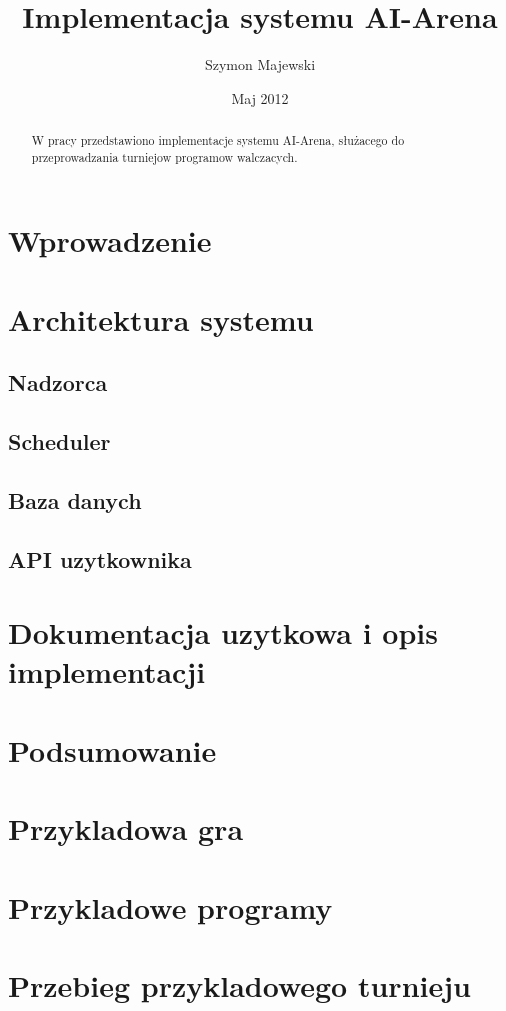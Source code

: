 \documentclass[licencjacka]{pracamgr}
\author{Szymon Majewski}
\title{Implementacja systemu AI-Arena}
\date{Maj 2012}
\begin{document}
\maketitle

\begin{abstract}
W pracy przedstawiono implementacje systemu AI-Arena,
 s{\l}u{\.z}acego do przeprowadzania turniejow programow walczacych.
\end{abstract}


\chapter*{Wprowadzenie}

\chapter{Architektura systemu}

\section{Nadzorca}

\section{Scheduler}

\section{Baza danych}

\section{API uzytkownika}


\chapter{Dokumentacja uzytkowa i opis implementacji}

\chapter{Podsumowanie}

\appendix

\chapter{Przykladowa gra}

\chapter{Przykladowe programy}

\chapter{Przebieg przykladowego turnieju}

\begin{thebibliography}{99}
\end{thebibliography}
\end{document}
